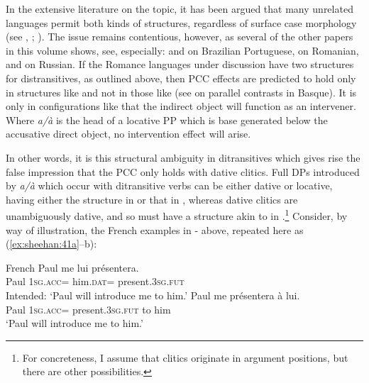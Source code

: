 \documentclass[output=paper,colorlinks,citecolor=brown,nonflat]{./langscibook}
\begin{document}
In the extensive literature on the topic, it has been argued that many unrelated languages permit both kinds of structures, regardless of surface case morphology (see \citealt{Marantz1993, Pesetsky1995, Cuervo2003, Anagnostopoulou2003, Pylkkänen2002}, \citeyear{Pylkkänen2008}; \citealt{MiyagawaTsujioka2004, Bruening2010DOC, HarleyMiyagawa2017}). The issue remains contentious, however, as several of the other papers in this volume shows, see, especially:  and  on Brazilian Portuguese,  on Romanian, and  on Russian. If the Romance languages under discussion have two structures for distransitives, as outlined above, then PCC effects are predicted to hold only in structures like  and not in those like  (see \citealt{Rezac2008} on parallel contrasts in Basque). It is only in configurations like  that the indirect object will function as an intervener. Where \textit{a/à} is the head of a locative PP which is base generated below the accusative direct object, no intervention effect will arise. 

In other words, it is this structural ambiguity in ditransitives which gives rise the false impression that the PCC only holds with dative clitics. Full DPs introduced by \textit{a/à} which occur with ditransitive verbs can be either dative or locative, having either the structure in  or that in , whereas dative clitics are unambiguously dative, and so must have a structure akin to in .\footnote{For concreteness, I assume that clitics originate in argument positions, but there are other possibilities.} Consider, by way of illustration, the French examples in - above, repeated here as (\ref{ex:sheehan:41a}--b): 

\ea%
    \label{ex:sheehan:41}
    French \citep[173--174]{Kayne1975}
    \ea\label{ex:sheehan:41a}
    \gll    *Paul   me       lui       présentera.\\
            Paul   \textsc{1sg}.\textsc{acc}=   him.\textsc{dat=} present.\textsc{3sg.fut}\\
    \glt    Intended: ‘Paul will introduce me to him.’
    \ex\label{ex:sheehan:41b}
    \gll    Paul   me     présentera     à lui.\\
            Paul  \textsc{1sg}.\textsc{acc}=  present.\textsc{3sg.fut}   to him\\
    \glt    ‘Paul will introduce me to him.’
    \z
\z
\end{document}
